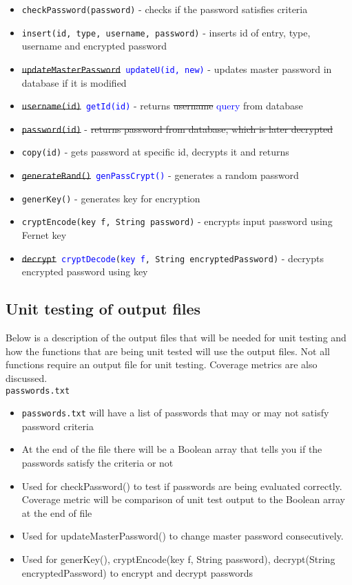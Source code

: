\documentclass[12pt, titlepage]{article}
\begin{document}
\begin{itemize}
    \item \texttt{checkPassword(password)} - checks if the password satisfies criteria
    \item \texttt{insert(id, type, username, password)} - inserts id of entry, type, username and encrypted password
    \item \texttt{\sout{updateMasterPassword} \textcolor{blue}{updateU(id, new)}} - updates master password in database if it is modified    
    \item \texttt{\sout{username(id)} \textcolor{blue}{getId(id)}} - returns \sout{username} \textcolor{blue}{query} from database
    \item \texttt{\sout{password(id)}} - \sout{returns password from database, which is later decrypted}
    \item \texttt{copy(id)} - gets password at specific id, decrypts it and returns
    \item \texttt{\sout{generateRand()} \textcolor{blue}{genPassCrypt()}} - generates a random password
    \item \texttt{generKey()} - generates key for encryption
    \item \texttt{cryptEncode(key f, String password)} - encrypts input password using Fernet key
    \item \texttt{\sout{decrypt} \textcolor{blue}{cryptDecode}(\textcolor{blue}{key f}, String encryptedPassword)} - decrypts encrypted password using key
\end{itemize}

\subsection{Unit testing of output files}		

Below is a description of the output files that will be needed for unit testing and how the functions that are being unit tested will use the output files. Not all functions require an output file for unit testing. Coverage metrics are also discussed.\\

\texttt{passwords.txt}
\begin{itemize}
    \item \texttt{passwords.txt} will have a list of passwords that may or may not satisfy password criteria 
    \item At the end of the file there will be a Boolean array that tells you if the passwords satisfy the criteria or not
    \item Used for checkPassword() to test if passwords are being evaluated correctly. Coverage metric will be comparison of unit test output to the Boolean array at the end of file
    \item Used for updateMasterPassword() to change master password consecutively.
    \item Used for generKey(), cryptEncode(key f, String password), decrypt(String encryptedPassword) to encrypt and decrypt passwords
\end{itemize}
\end{document}
